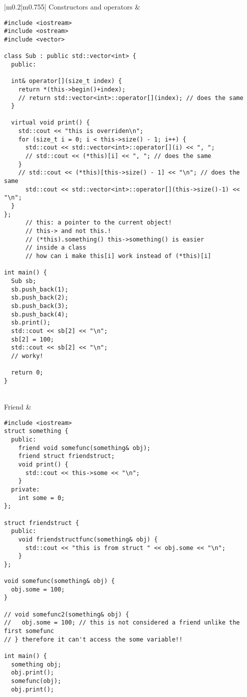\documentclass[main.tex,fontsize=8pt,paper=a4,paper=portrait,DIV=calc]{scrartcl}
\begin{document}
\pagebreak
\begin{table}[ht!]
\begin{tabular}{|m{0.2\linewidth}|m{0.755\linewidth}|}
\hline
Constructors and operators & 
\vspace{2mm}
\begin{lstlisting}
#include <iostream>
#include <ostream>
#include <vector>

class Sub : public std::vector<int> {
  public:

  int& operator[](size_t index) {
    return *(this->begin()+index);
    // return std::vector<int>::operator[](index); // does the same
  }

  virtual void print() {
    std::cout << "this is overriden\n";
    for (size_t i = 0; i < this->size() - 1; i++) {
      std::cout << std::vector<int>::operator[](i) << ", ";
      // std::cout << (*this)[i] << ", "; // does the same
    }
    // std::cout << (*this)[this->size() - 1] << "\n"; // does the same
      std::cout << std::vector<int>::operator[](this->size()-1) << "\n";
  }
};
      // this: a pointer to the current object!
      // this-> and not this.!
      // (*this).something() this->something() is easier
      // inside a class
      // how can i make this[i] work instead of (*this)[i]

int main() { 
  Sub sb;
  sb.push_back(1);
  sb.push_back(2);
  sb.push_back(3);
  sb.push_back(4);
  sb.print();
  std::cout << sb[2] << "\n";
  sb[2] = 100;
  std::cout << sb[2] << "\n";
  // worky!

  return 0; 
}
\end{lstlisting}
\\
\hline
Friend & 
\vspace{2mm}
\begin{lstlisting}
#include <iostream>
struct something {
  public: 
    friend void somefunc(something& obj);
    friend struct friendstruct;
    void print() {
      std::cout << this->some << "\n";
    }
  private: 
    int some = 0;
};

struct friendstruct {
  public: 
    void friendstructfunc(something& obj) {
      std::cout << "this is from struct " << obj.some << "\n";
    }
};

void somefunc(something& obj) {
  obj.some = 100;
}

// void somefunc2(something& obj) {
//   obj.some = 100; // this is not considered a friend unlike the first somefunc
// } therefore it can't access the some variable!!

int main() {
  something obj;
  obj.print();
  somefunc(obj);
  obj.print();


\end{lstlisting}
\end{tabular}
\end{table}
\end{document}
